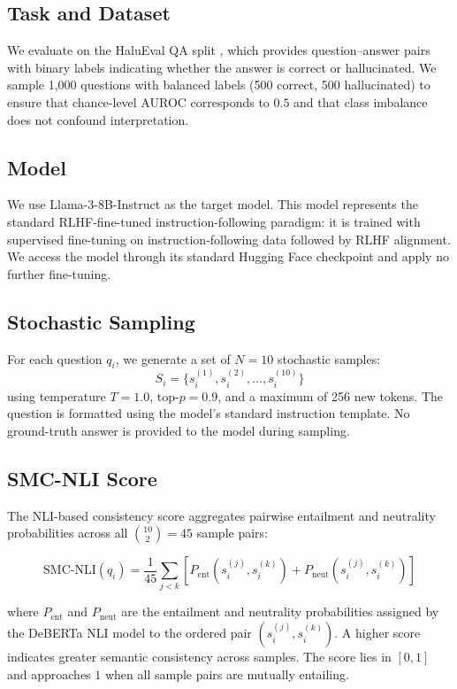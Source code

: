 \subsection{Task and Dataset}

We evaluate on the HaluEval QA split \cite{Li2023HaluEval}, which provides question--answer pairs with binary labels indicating whether the answer is correct or hallucinated. We sample 1,000 questions with balanced labels (500 correct, 500 hallucinated) to ensure that chance-level AUROC corresponds to $0.5$ and that class imbalance does not confound interpretation.

\subsection{Model}

We use Llama-3-8B-Instruct \cite{Meta2024Llama3} as the target model. This model represents the standard RLHF-fine-tuned instruction-following paradigm: it is trained with supervised fine-tuning on instruction-following data followed by RLHF alignment. We access the model through its standard Hugging Face checkpoint and apply no further fine-tuning.

\subsection{Stochastic Sampling}

For each question $q_i$, we generate a set of $N = 10$ stochastic samples:
\[
  S_i = \{s_i^{(1)}, s_i^{(2)}, \ldots, s_i^{(10)}\}
\]
using temperature $T = 1.0$, top-$p = 0.9$, and a maximum of 256 new tokens. The question is formatted using the model's standard instruction template. No ground-truth answer is provided to the model during sampling.

\subsection{SMC-NLI Score}

The NLI-based consistency score aggregates pairwise entailment and neutrality probabilities across all $\binom{10}{2} = 45$ sample pairs:

\begin{equation}
  \text{SMC-NLI}(q_i) = \frac{1}{45} \sum_{j < k} \left[ P_\text{ent}(s_i^{(j)}, s_i^{(k)}) + P_\text{neut}(s_i^{(j)}, s_i^{(k)}) \right]
\end{equation}

where $P_\text{ent}$ and $P_\text{neut}$ are the entailment and neutrality probabilities assigned by the DeBERTa NLI model \cite{He2021DeBERTa} to the ordered pair $(s_i^{(j)}, s_i^{(k)})$. A higher score indicates greater semantic consistency across samples. The score lies in $[0, 1]$ and approaches $1$ when all sample pairs are mutually entailing.

